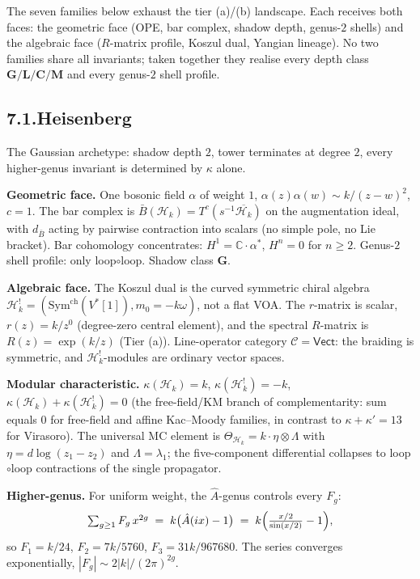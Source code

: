 \documentclass[11pt]{report}
\theoremstyle{definition}
\theoremstyle{remark}
\providecommand{\cC}{\mathcal{C}}
\providecommand{\cH}{\mathcal{H}}
\providecommand{\barB}{\bar{B}}
\providecommand{\Sym}{\mathrm{Sym}}
\providecommand{\bC}{\mathbb{C}}
\providecommand{\ch}{\mathrm{ch}}
\numberwithin{equation}{section}
\begin{document}
The seven families below exhaust the tier (a)/(b) landscape.
Each receives both faces: the geometric face (OPE, bar complex,
shadow depth, genus-$2$ shells) and the algebraic face
($R$-matrix profile, Koszul dual, Yangian lineage). No two
families share all invariants; taken together they realise
every depth class $\mathbf G / \mathbf L / \mathbf C / \mathbf M$
and every genus-$2$ shell profile.

\subsection*{7.1.\quad Heisenberg}

The Gaussian archetype: shadow depth $2$, tower terminates at
degree $2$, every higher-genus invariant is determined by $\kappa$
alone.

\medskip\noindent\textbf{Geometric face.} One bosonic field
$\alpha$ of weight $1$, $\alpha(z)\alpha(w) \sim k/(z-w)^2$,
$c = 1$. The bar complex is
$\barB(\cH_k) = T^c(s^{-1}\overline{\cH_k})$ on the augmentation
ideal, with $d_{\barB}$ acting by pairwise contraction
into scalars (no simple pole, no Lie bracket). Bar cohomology
concentrates: $H^1 = \bC\cdot\alpha^*$, $H^n = 0$ for $n \ge 2$.
Genus-$2$ shell profile: only loop$\circ$loop. Shadow class
$\mathbf G$.

\medskip\noindent\textbf{Algebraic face.} The Koszul dual is
the curved symmetric chiral algebra
$\cH_k^! = (\Sym^{\ch}(V^*[1]), m_0 = -k\omega)$, not a flat VOA.
The $r$-matrix is scalar, $r(z) = k/z^0$ (degree-zero central
element), and the spectral $R$-matrix is $R(z) = \exp(k/z)$
(Tier (a)). Line-operator category $\cC = \mathsf{Vect}$:
the braiding is symmetric, and $\cH_k^!$-modules are ordinary
vector spaces.

\medskip\noindent\textbf{Modular characteristic.}
$\kappa(\cH_k) = k$, $\kappa(\cH_k^!) = -k$,
$\kappa(\cH_k) + \kappa(\cH_k^!) = 0$ (the free-field/KM
branch of complementarity: sum equals $0$ for free-field and
affine Kac--Moody families, in contrast to $\kappa + \kappa' =
13$ for Virasoro). The universal MC element is
$\Theta_{\cH_k} = k \cdot \eta \otimes \Lambda$ with
$\eta = d\log(z_1 - z_2)$ and $\Lambda = \lambda_1$; the
five-component differential collapses to loop$\circ$loop
contractions of the single propagator.

\medskip\noindent\textbf{Higher-genus.} For uniform weight,
the $\hat A$-genus controls every $F_g$:
\begin{equation}\label{eq:ahat-universality-preface-b}
\textstyle\sum_{g\ge 1} F_g\, x^{2g}
\;=\;
k\bigl(\hat A(ix)-1\bigr)
\;=\;
k\Bigl(\tfrac{x/2}{\sin(x/2)}-1\Bigr),
\end{equation}
so $F_1 = k/24$, $F_2 = 7k/5760$, $F_3 = 31k/967680$. The series
converges exponentially, $|F_g| \sim 2|k|/(2\pi)^{2g}$.
\end{document}
